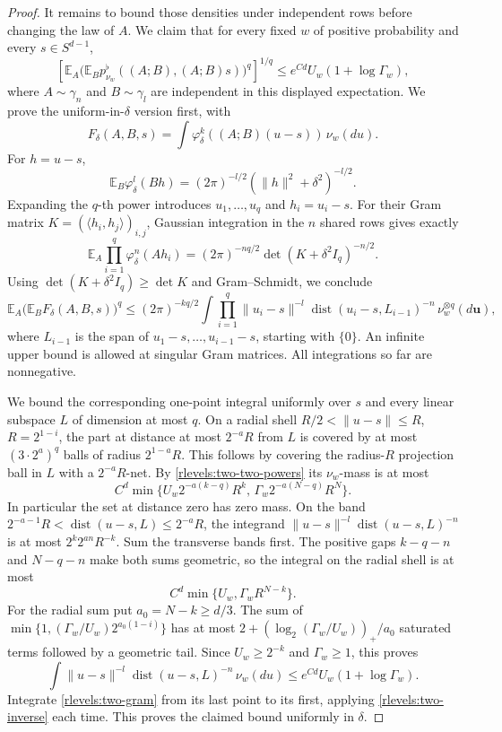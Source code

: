 \begin{proof}
It remains to bound those densities under independent rows before
changing the law of \(A\).  We claim that for every fixed
\(w\) of positive probability and every \(s\in S^{d-1}\),
\begin{equation}\label{rlevels:two-moment}
 \left[\mathbb E_A
 \bigl(\mathbb E_B p^\flat_{\nu_w}((A;B),(A;B)s)\bigr)^q
 \right]^{1/q}
 \le e^{Cd}U_w(1+\log\Gamma_w),
\end{equation}
where \(A\sim\gamma_n\) and \(B\sim\gamma_l\) are
independent in this displayed expectation.  We prove the
uniform-in-\(\delta\) version first, with
\[
 F_\delta(A,B,s)
   =\int\varphi_\delta^k((A;B)(u-s))\,\nu_w(du).
\]
For \(h=u-s\),
\[
 \mathbb E_B\varphi_\delta^l(Bh)
 =(2\pi)^{-l/2}(\|h\|^2+\delta^2)^{-l/2}.
\]
Expanding the \(q\)-th power introduces \(u_1,\ldots,u_q\) and
\(h_i=u_i-s\).  For their Gram matrix
\(K=(\langle h_i,h_j\rangle)_{i,j}\), Gaussian integration in the
\(n\) shared rows gives exactly
\[
 \mathbb E_A\prod_{i=1}^q\varphi_\delta^n(Ah_i)
 =(2\pi)^{-nq/2}\det(K+\delta^2I_q)^{-n/2}.
\]
Using \(\det(K+\delta^2I_q)\ge\det K\) and Gram--Schmidt,
we conclude
\begin{equation}\label{rlevels:two-gram}
 \mathbb E_A\bigl(\mathbb E_B F_\delta(A,B,s)\bigr)^q
 \le (2\pi)^{-kq/2}
 \int\prod_{i=1}^q
   \|u_i-s\|^{-l}\operatorname{dist}(u_i-s,L_{i-1})^{-n}
   \,\nu_w^{\otimes q}(d\mathbf u),
\end{equation}
where \(L_{i-1}\) is the span of \(u_1-s,\ldots,u_{i-1}-s\),
starting with \(\{0\}\).  An infinite upper bound is allowed at
singular Gram matrices.  All integrations so far are nonnegative.

We bound the corresponding one-point integral uniformly over \(s\)
and every linear subspace \(L\) of dimension at most \(q\).
On a radial shell \(R/2<\|u-s\|\le R\), \(R=2^{1-i}\),
the part at distance at most \(2^{-a}R\) from \(L\) is covered
by at most \((3\cdot2^a)^q\) balls of radius \(2^{1-a}R\).
This follows by covering the radius-\(R\) projection ball in \(L\)
with a \(2^{-a}R\)-net.  By \eqref{rlevels:two-two-powers} its
\(\nu_w\)-mass is at most
\[
 C^d\min\{
 U_w2^{-a(k-q)}R^k,\,
 \Gamma_w2^{-a(N-q)}R^N\}.
\]
In particular the set at distance zero has zero mass.  On the band
\(2^{-a-1}R<\operatorname{dist}(u-s,L)\le2^{-a}R\), the
integrand \(\|u-s\|^{-l}\operatorname{dist}(u-s,L)^{-n}\)
is at most \(2^k2^{an}R^{-k}\).  Sum the transverse bands first.
The positive gaps \(k-q-n\) and \(N-q-n\) make both sums geometric,
so the integral on the radial shell is at most
\[
 C^d\min\{U_w,\Gamma_wR^{N-k}\}.
\]
For the radial sum put \(a_0=N-k\ge d/3\).  The sum of
\(\min\{1,(\Gamma_w/U_w)2^{a_0(1-i)}\}\) has at most
\(2+(\log_2(\Gamma_w/U_w))_+/a_0\) saturated terms followed by
a geometric tail.  Since \(U_w\ge2^{-k}\) and
\(\Gamma_w\ge1\), this proves
\begin{equation}\label{rlevels:two-inverse}
 \int\|u-s\|^{-l}\operatorname{dist}(u-s,L)^{-n}\,\nu_w(du)
 \le e^{Cd}U_w(1+\log\Gamma_w).
\end{equation}
Integrate \eqref{rlevels:two-gram} from its last point to its first,
applying \eqref{rlevels:two-inverse} each time.  This proves the
claimed bound uniformly in \(\delta\).


\end{proof}
